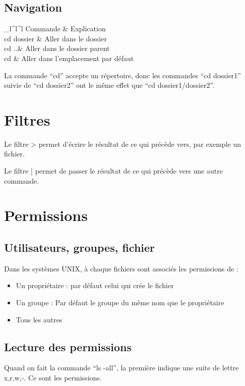 \documentclass[french]{yLectureNote}
\begin{document}
\subsection{Navigation}
\begin{tabular}{_l^l^l}
		\tableHeaderStyle%
		Commande & Explication\\
		cd dossier & Aller dans le dossier\\
		cd ..& Aller dans le dossier parent\\
		cd & Aller dans l'emplacement par défaut\\
	\end{tabular}

	La commande ``cd'' accepte un répertoire, donc les commandes ``cd dossier1'' suivie de ``cd dossier2'' ont le m\^eme effet que ``cd dossier1/dossier2''.
	\section{Filtres}
	Le filtre > permet d'écrire le résultat de ce qui précède vers, par exemple un fichier.


Le filtre | permet de passer le résultat de ce qui précède vers une autre commande.

	\section{Permissions}
	\subsection{Utilisateurs, groupes, fichier}
	Dans les systèmes UNIX, à chaque fichiers sont associés les permissions de :
	\begin{itemize}
	 \item Un propriétaire : par défaut celui qui crée le fichier
	 \item Un groupe : Par défaut le groupe du m\^eme nom que le propriétaire
	 \item Tous les autres
	\end{itemize}
\subsection{Lecture des permissions}
Quand on fait la commande ``ls -all'', la première indique une suite de lettre x,r,w,-. Ce sont les permissions.
\end{document}

